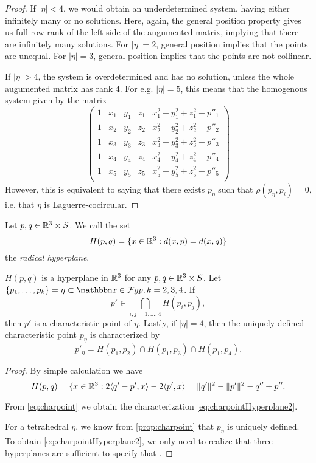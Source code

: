 \begin{proof}
	If $|\eta|<4$, we would obtain an underdetermined system, having either infinitely many or no solutions.  Here, again, the general position property gives us full row rank of the left side of the augumented matrix, implying that there are infinitely many solutions. For $|\eta|=2$, general position implies that the points are unequal. For $|\eta| =3$, general position implies that the points are not collinear.


	If $|\eta|>4$, the system is overdetermined and has no solution, unless the whole augumented matrix has rank $4$. For e.g. $|\eta|=5$, this means that the homogenous system given by the matrix 
	$$
	\begin{pmatrix}\label{circmat}
		1 & x_1 & y_1 & z_1 & x_1^2 + y_1^2 + z_1^2 - p''_1  \\
		1 & x_2 & y_2 & z_2 & x_2^2 + y_2^2 + z_2^2 - p''_2  \\
		1 & x_3 & y_3 & z_3 & x_3^2 + y_3^2 + z_3^2 - p''_3  \\
		1 & x_4 & y_4 & z_4 & x_4^2 + y_4^2 + z_4^2 - p''_4  \\
		1 & x_5 & y_5 & z_5 & x_5^2 + y_5^2 + z_5^2 - p''_5  \\
	\end{pmatrix}
	$$
	However, this is equivalent to saying that there exists $p_\eta$ such that $\rho(p_\eta,p_i)=0$, i.e. that $\eta$ is Laguerre-cocircular.
\end{proof}

\begin{definition} Let $p,q \in {\mathbb R^3}\times S$. We call the set 
	$$H(p,q) = \{ x\in {\mathbb R^3}: d(x,p) = d(x,q) \}$$
	the \textit{radical hyperplane}.
\end{definition}

\begin{proposition}\label{prop:charpointHyperplane} $H(p,q)$ is a hyperplane in ${\mathbb R^3}$ for any $p,q\in{\mathbb R^3}\times S$. Let $\{p_1,\dots,p_k\} =\eta\subset\x\in\mathcal F{gp}, k=2,3,4$. If 
	\begin{equation}\label{eq:charpointHyperplane1}p'\in\bigcap_{i,j=1,\dots,4} H(p_i,p_j),\end{equation}
	then $p'$ is a characteristic point of $\eta$. Lastly, if $|\eta|=4$, then the uniquely defined characteristic point $p_\eta$ is characterized by
	\begin{equation}\label{eq:charpointHyperplane2}p'_\eta = H(p_1,p_2)\cap H(p_1,p_3) \cap H(p_1,p_4).\end{equation}
\end{proposition}
\begin{proof}
	By simple calculation we have
	$$H(p,q) = \{x \in {\mathbb R^3}: 2 \langle q'-p',x \rangle  - 2\langle p', x \rangle  = \|q'\|^2 - \|p'\|^2  - q'' + p''.$$

		From \ref{eq:charpoint} we obtain the characterization \ref{eq:charpointHyperplane2}. 

		For a tetrahedral $\eta$, we know from \ref{prop:charpoint} that $p_\eta$ is uniquely defined. To obtain \ref{eq:charpointHyperplane2}, we only need to realize that three hyperplanes are sufficient to specify that .
\end{proof}

